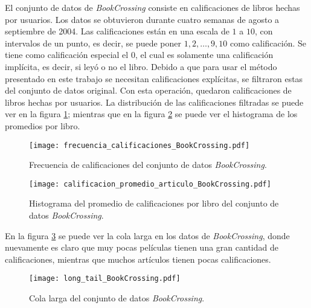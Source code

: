 El conjunto de datos de \textit{BookCrossing} consiste en  calificaciones de  libros hechas por  usuarios. Los datos se obtuvieron durante cuatro semanas de agosto a septiembre de 2004. Las calificaciones están en una escala de $1$ a $10$, con intervalos de un punto, es decir, se puede poner $1, 2, \hdots, 9, 10$ como calificación. Se tiene como calificación especial el $0$, el cual es solamente una calificación implícita, es decir, si leyó o no el libro. Debido a que para usar el método presentado en este trabajo se necesitan calificaciones explícitas, se filtraron estas del conjunto de datos original. Con esta operación, quedaron  calificaciones de  libros hechas por  usuarios. La distribución de las calificaciones filtradas se puede ver en la figura \ref{fig:BC_frec_calificaciones}; mientras que en la figura \ref{fig:BC_hist_prom_cals} se puede ver el histograma de los promedios por libro.

\begin{figure}[H]
	\centering
 	\texttt{[image: frecuencia\_calificaciones\_BookCrossing.pdf]}
 	\caption{Frecuencia de calificaciones del conjunto de datos \textit{BookCrossing}.}
 	\label{fig:BC_frec_calificaciones}
\end{figure}

\begin{figure}[H]
	\centering
 	\texttt{[image: calificacion\_promedio\_articulo\_BookCrossing.pdf]}
 	\caption{Histograma del promedio de calificaciones por libro del conjunto de datos \textit{BookCrossing}.}
 	\label{fig:BC_hist_prom_cals}
\end{figure}

En la figura \ref{fig:BC_long_tail} se puede ver la cola larga en los datos de \textit{BookCrossing}, donde nuevamente es claro que muy pocas películas tienen una gran cantidad de calificaciones, mientras que muchos artículos tienen pocas calificaciones.

\begin{figure}[H]
	\centering
 	\texttt{[image: long\_tail\_BookCrossing.pdf]}
 	\caption{Cola larga del conjunto de datos \textit{BookCrossing}.}
 	\label{fig:BC_long_tail}
\end{figure}


